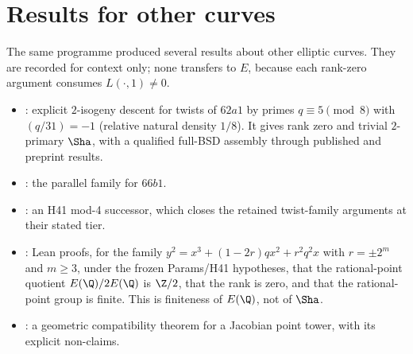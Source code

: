 \section{Results for other curves}\label{app:other}

The same programme produced several results about other elliptic curves. They are recorded for context only; none transfers to $E$, because each rank-zero argument consumes $L(\cdot,1)\ne0$.

\begin{itemize}[leftmargin=*]
\item {}: explicit $2$-isogeny descent for twists of $62a1$ by primes $q\equiv5\pmod8$ with $(q/31)=-1$ (relative natural density $1/8$). It gives rank zero and trivial $2$-primary $\Sha$, with a qualified full-BSD assembly through published and preprint results.
\item {}: the parallel family for $66b1$.
\item {}: an H41 mod-4 successor, which closes the retained twist-family arguments at their stated tier.
\item {}: Lean proofs, for the family $y^2=x^3+(1-2r)qx^2+r^2q^2x$ with $r=\pm2^m$ and $m\ge3$, under the frozen Params/H41 hypotheses, that the rational-point quotient $E(\Q)/2E(\Q)$ is $\Z/2$, that the rank is zero, and that the rational-point group is finite. This is finiteness of $E(\Q)$, not of $\Sha$.
\item {}: a geometric compatibility theorem for a Jacobian point tower, with its explicit non-claims.
\end{itemize}
